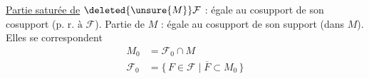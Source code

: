 \uline{Partie saturée  de} $\deleted{\unsure{M}}\mathcal F$ : égale au cosupport de son cosupport ($\text{p. r. à }\mathcal F$). Partie   de $M$ : égale au cosupport de son support (dans $M$). Elles se correspondent  
\[
\begin{aligned}
M_0&=\mathcal F_0\cap M\\
\mathcal F_0&=\{\,F\in\mathcal F\mid\overline F\subset M_0\,\}
\end{aligned}
\]
